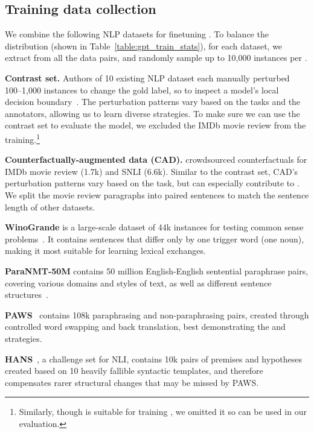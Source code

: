 \subsection{Training data collection}


We combine the following NLP datasets for finetuning \sysname.
To balance the distribution (shown in Table~\ref{table:gpt_train_stats}), for each dataset, we extract \tagstrs from all the data pairs, and randomly sample up to 10,000 instances per \tagstr.

\textbf{Contrast set.}
Authors of 10 existing NLP dataset each manually perturbed 100--1,000 instances to change the gold label, so to inspect a model's local decision boundary~\cite{gardner2020contrast}.
The perturbation patterns vary based on the tasks and the annotators, allowing us to learn diverse strategies.
To make sure we can use the contrast set to evaluate the \sst model, we excluded the IMDb movie review from the training.\footnote{Similarly, though \qqp is suitable for training \sysname, we omitted it so \qqp can be used in our evaluation.}


\textbf{Counterfactually-augmented data (CAD).}
\citet{kaushik2019learning} crowdsourced counterfactuals for IMDb movie review (1.7k) and SNLI (6.6k).
Similar to the contrast set, CAD's perturbation patterns vary based on the task, but can especially contribute to .
We split the movie review paragraphs into paired sentences to match the sentence length of other datasets.


\textbf{WinoGrande} is a large-scale dataset of 44k instances for testing common sense problems~\cite{sakaguchi2019winogrande}.
It contains sentences that differ only by one trigger word (\eg one noun), making it most suitable for learning lexical exchanges.

\textbf{ParaNMT-50M} contains 50 million English-English sentential paraphrase pairs, covering various domains and styles of text, as well as different sentence structures~\cite{wieting2017paranmt}. 

\textbf{PAWS}~\cite{zhang2019paws} contains 108k paraphrasing and non-paraphrasing pairs, created through controlled word swapping and back translation, best demonstrating the  and  strategies.


\textbf{HANS}~\cite{mccoy2019right}, a challenge set for NLI, contains 10k pairs of premises and hypotheses created based on 10 heavily fallible syntactic templates, and therefore compensates rarer structural changes that may be missed by PAWS.



